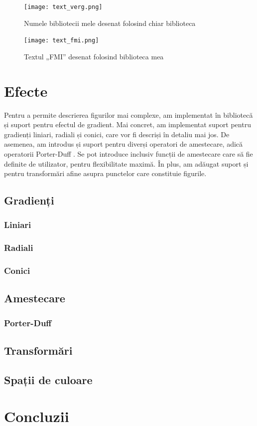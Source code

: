 \documentclass[a4paper, 12pt]{report}
\begin{document}
\begin{figure}[ht]
    \texttt{[image: text\_verg.png]}
    \centering
    \caption{Numele bibliotecii mele desenat folosind chiar biblioteca}
    \label{fig-text-verg}
\end{figure}

\begin{figure}[ht]
    \texttt{[image: text\_fmi.png]}
    \centering
    \caption{Textul „FMI” desenat folosind biblioteca mea}
    \label{fig-text-fmi}
\end{figure}

\chapter{Efecte}

Pentru a permite descrierea figurilor mai complexe, am implementat în bibliotecă și suport pentru efectul de gradient.
Mai concret, am implementat suport pentru gradienți liniari, radiali și conici, care vor fi descriși în detaliu mai jos.
De asemenea, am introdus și suport pentru diverși operatori de amestecare, adică operatorii Porter-Duff \cite{Porter-Duff}.
Se pot introduce inclusiv funcții de amestecare care să fie definite de utilizator, pentru flexibilitate maximă. În plus,
am adăugat suport și pentru transformări afine asupra punctelor care constituie figurile.

\section{Gradienți}

\subsection{Liniari}
\subsection{Radiali}
\subsection{Conici}

\section{Amestecare}
\subsection{Porter-Duff}

\section{Transformări}

\section{Spații de culoare}

\chapter{Concluzii}

\printbibliography
\end{document}
